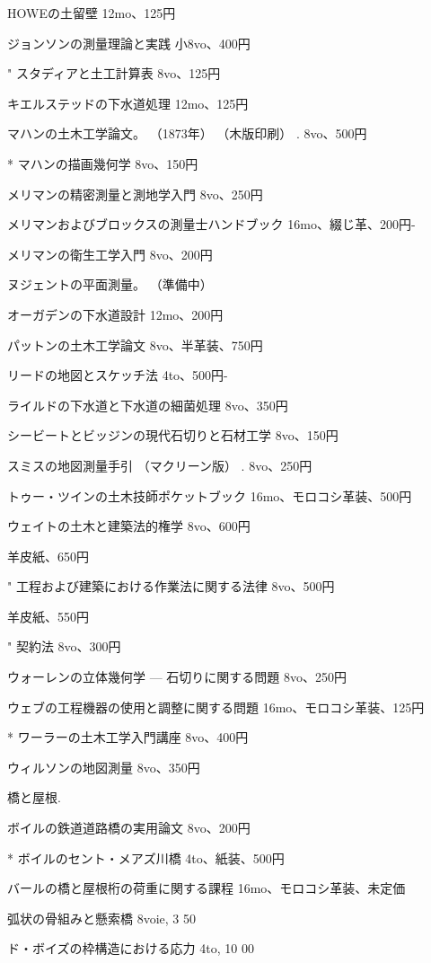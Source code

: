 \documentclass[a4paper,11pt,openany]{ltjsbook}
\begin{document}
HOWEの土留壁 12mo、125円

ジョンソンの測量理論と実践 小8vo、400円

"        スタディアと土工計算表 8vo、125円

キエルステッドの下水道処理 12mo、125円

マハンの土木工学論文。 （1873年） （木版印刷） . 8vo、500円

* マハンの描画幾何学 8vo、150円

メリマンの精密測量と測地学入門 8vo、250円

メリマンおよびブロックスの測量士ハンドブック 16mo、綴じ革、200円-

メリマンの衛生工学入門 8vo、200円

ヌジェントの平面測量。 （準備中）

オーガデンの下水道設計 12mo、200円

パットンの土木工学論文 8vo、半革装、750円

リードの地図とスケッチ法 4to、500円-

ライルドの下水道と下水道の細菌処理 8vo、350円

シービートとビッジンの現代石切りと石材工学 8vo、150円

スミスの地図測量手引 （マクリーン版） . 8vo、250円

トゥー・ツインの土木技師ポケットブック 16mo、モロコシ革装、500円

ウェイトの土木と建築法的権学 8vo、600円

羊皮紙、650円

"      工程および建築における作業法に関する法律 8vo、500円

羊皮紙、550円

"      契約法 8vo、300円

ウォーレンの立体幾何学 — 石切りに関する問題 8vo、250円

ウェブの工程機器の使用と調整に関する問題 16mo、モロコシ革装、125円

* ワーラーの土木工学入門講座 8vo、400円

ウィルソンの地図測量 8vo、350円

橋と屋根.

ボイルの鉄道道路橋の実用論文 8vo、200円

* ボイルのセント・メアズ川橋 4to、紙装、500円

バールの橋と屋根桁の荷重に関する課程 16mo、モロコシ革装、未定価

弧状の骨組みと懸索橋 8voie, 3 50

ド・ボイズの枠構造における応力 4to, 10 00
\end{document}

